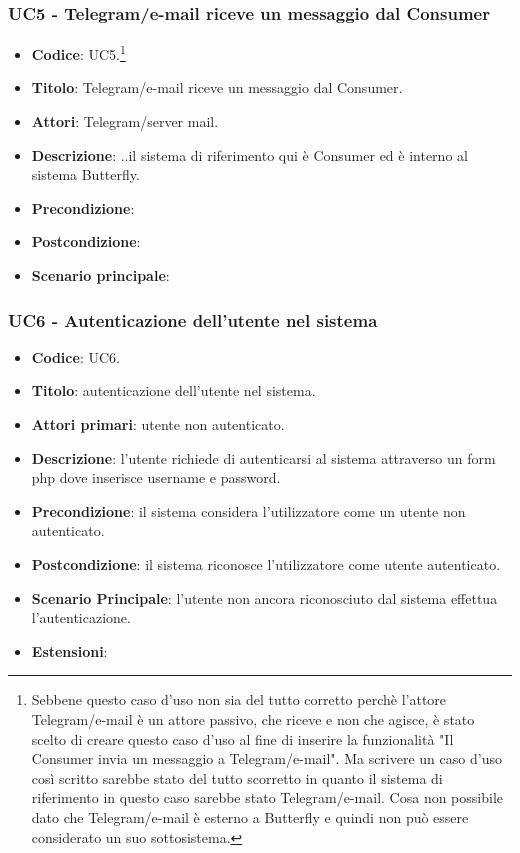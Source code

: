 \subsubsection{UC5 - Telegram/e-mail riceve un messaggio dal Consumer} 
	\begin{itemize}
		\item \textbf{Codice}: UC5.\footnote{Sebbene questo caso d'uso non sia del tutto corretto perchè l'attore Telegram/e-mail è un attore passivo, che riceve e non che agisce, è stato scelto di creare questo caso d'uso al fine di inserire la funzionalità "Il Consumer invia un messaggio a Telegram/e-mail". Ma scrivere un caso d'uso così scritto sarebbe stato del tutto scorretto in quanto il sistema di riferimento in questo caso sarebbe stato Telegram/e-mail. Cosa non possibile dato che Telegram/e-mail è esterno a Butterfly e quindi non può essere considerato un suo sottosistema.}
		\item \textbf{Titolo}: Telegram/e-mail riceve un messaggio dal Consumer.
		\item \textbf{Attori}: Telegram/server mail.
		\item \textbf{Descrizione}: ..il sistema di riferimento qui è Consumer ed è interno al sistema Butterfly.
		\item \textbf{Precondizione}:
		\item \textbf{Postcondizione}:
		\item \textbf{Scenario principale}: 
	\end{itemize}




\subsubsection{UC6 - Autenticazione dell'utente nel sistema}

	\begin{itemize}
		\item \textbf{Codice}: UC6.
		\item \textbf{Titolo}: autenticazione dell'utente nel sistema.
		\item \textbf{Attori primari}: utente non autenticato.
		\item \textbf{Descrizione}: l'utente richiede di autenticarsi al sistema attraverso un form php dove inserisce username e password.
		\item \textbf{Precondizione}: il sistema considera l’utilizzatore come un utente non autenticato.
		\item \textbf{Postcondizione}: il sistema riconosce l'utilizzatore come utente autenticato.
		\item \textbf{Scenario Principale}: l'utente non ancora riconosciuto dal sistema effettua l'autenticazione.
		\item \textbf{Estensioni}: 
	\end{itemize}
	

